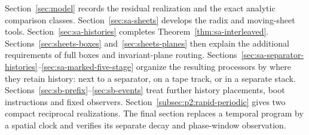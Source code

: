 Section~\ref{sec:model} records the residual realization and the exact
analytic comparison classes. Section~\ref{sec:sa-sheets} develops the
radix and moving-sheet tools. Section~\ref{sec:sa-histories} completes
Theorem~\ref{thm:sa-interleaved}. Sections~\ref{sec:sheets-boxes}
and~\ref{sec:sheets-planes} then explain the additional requirements of
full boxes and invariant-plane routing. Sections~\ref{sec:sa-separator-histories}--\ref{sec:sa-marked-five-stage}
organize the resulting processors by where they retain history: next to
a separator, on a tape track, or in a separate stack.
Sections~\ref{sec:sb-prefix}--\ref{sec:sb-events} treat further
history placements, boot instructions and fixed observers.
Section~\ref{subsec:p2:rapid-periodic} gives two compact reciprocal
realizations. The final section replaces a temporal program by a spatial
clock and verifies its separate decay and phase-window observation.
